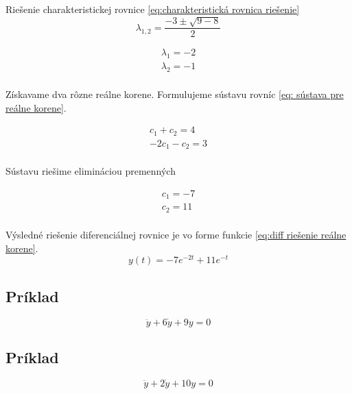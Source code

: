 \documentclass[a4paper,10pt]{article}
\begin{document}
Riešenie charakteristickej rovnice \eqref{eq:charakteristická rovnica riešenie}
\begin{equation*}
\lambda_{1,2}=\frac{-3\pm\sqrt{9-8}}{2}
\end{equation*}

\begin{equation*}
\begin{array}{c}
	\lambda_1=-2\\
	\lambda_2=-1\\
\end{array}
\end{equation*}

Získavame dva rôzne reálne korene.
Formulujeme sústavu rovníc \eqref{eq: sústava pre reálne korene}.

\begin{equation*}
	\begin{array}{c}
	c_1+c_2=4 \\
	-2c_1-c_2=3 \\
	\end{array}
\end{equation*}

Sústavu riešime elimináciou premenných

\begin{equation*}
	\begin{array}{c}
	c_1=-7 \\
	c_2=11 \\
	\end{array}
\end{equation*}

Výsledné riešenie diferenciálnej rovnice je vo forme funkcie \eqref{eq:diff riešenie reálne korene}.
\begin{equation*}
 y(t)=-7e^{-2t}+11e^{-t}
\end{equation*}

\subsection{Príklad}

\begin{equation*}
\ddot{y}+6\dot{y}+9y=0
\end{equation*}

\subsection{Príklad}

\begin{equation*}
\ddot{y}+2\dot{y}+10y=0
\end{equation*}
\end{document}
